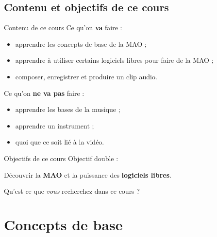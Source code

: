 \documentclass{beamer}
\begin{document}
\subsection{Contenu et objectifs de ce cours}
\begin{frame}{Contenu de ce cours}
  Ce qu'on \textbf{va} faire :
  \begin{itemize}
  \item apprendre les concepts de base de la MAO ;
  \item apprendre à utiliser certains logiciels libres pour faire de la MAO ;
  \item composer, enregistrer et produire un clip audio.
  \end{itemize}
  \medskip
  
  Ce qu'on \textbf{ne va pas} faire :
  \begin{itemize}
  \item apprendre les bases de la musique ;
  \item apprendre un instrument ;
  \item quoi que ce soit lié à la vidéo.
  \end{itemize}
\end{frame}

\begin{frame}{Objectifs de ce cours}
  Objectif double :
  
  Découvrir la \textbf{MAO} et la puissance des \textbf{logiciels libres}.
  \bigskip
  
  Qu'est-ce que \emph{vous} recherchez dans ce cours ?
\end{frame}



\section{Concepts de base}
\end{document}
